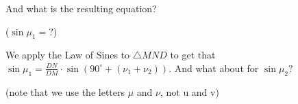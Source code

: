 









And what is the resulting equation?

($\sin \mu_1=?$)





We apply the Law of Sines to $\triangle MND$ to get that $\sin \mu_1 = \frac{DN}{DM} \cdot \sin{(90^{\circ}+(\nu_1 + \nu_2))}.$ And what about for $\sin \mu_2?$

(note that we use the letters $\mu$ and $\nu$, not u and v)



